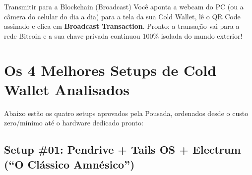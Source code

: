 \documentclass{pousadaguide}
\begin{document}
\begin{passo}{Transmitir para a Blockchain (Broadcast)}
Você aponta a webcam do PC (ou a câmera do celular do dia a dia) para a tela da sua Cold Wallet, lê o QR Code assinado e clica em \textbf{Broadcast Transaction}. Pronto: a transação vai para a rede Bitcoin e a sua chave privada continuou 100\% isolada do mundo exterior!
\end{passo}

\clearpage
\section{Os 4 Melhores Setups de Cold Wallet Analisados}

Abaixo estão os quatro setups aprovados pela Pousada, ordenados desde o custo zero/mínimo até o hardware dedicado pronto:

\subsection{Setup \#01: Pendrive + Tails OS + Electrum (“O Clássico Amnésico”)}
\end{document}
